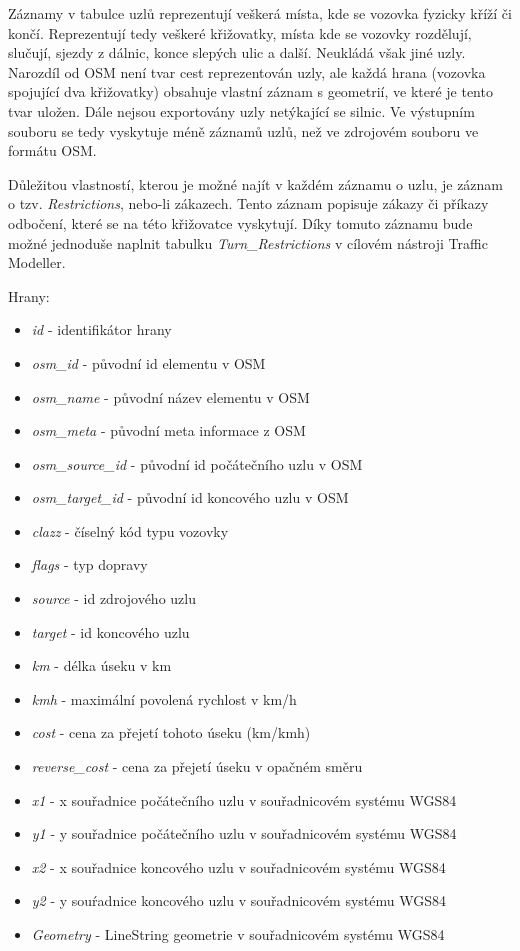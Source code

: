 Záznamy v tabulce uzlů reprezentují veškerá místa, kde se vozovka fyzicky kříží či končí. Reprezentují tedy veškeré křižovatky, místa kde se vozovky rozdělují, slučují, sjezdy z dálnic, konce slepých ulic a další. Neukládá však jiné uzly. Narozdíl od OSM není tvar cest reprezentován uzly, ale každá hrana (vozovka spojující dva křižovatky) obsahuje vlastní záznam s geometrií, ve které je tento tvar uložen. Dále nejsou exportovány uzly netýkající se silnic. Ve výstupním souboru se tedy vyskytuje méně záznamů uzlů, než ve zdrojovém souboru ve formátu OSM. 

Důležitou vlastností, kterou je možné najít v každém záznamu o uzlu, je záznam o tzv. \textit{Restrictions}, nebo-li zákazech. Tento záznam popisuje zákazy či příkazy odbočení, které se na této křižovatce vyskytují. Díky tomuto záznamu bude možné jednoduše naplnit tabulku \textit{Turn\_Restrictions} v cílovém nástroji Traffic Modeller.

Hrany:
\begin{itemize}
  \item \textit{id} - identifikátor hrany
  \item \textit{osm\_id} - původní id elementu v OSM
  \item \textit{osm\_name} - původní název elementu v OSM
  \item \textit{osm\_meta} - původní meta informace z OSM
  \item \textit{osm\_source\_id} - původní id počátečního uzlu v OSM
  \item \textit{osm\_target\_id} - původní id koncového uzlu v OSM
  \item \textit{clazz} - číselný kód typu vozovky
  \item \textit{flags} - typ dopravy
  \item \textit{source} - id zdrojového uzlu
  \item \textit{target} - id koncového uzlu
  \item \textit{km} - délka úseku v km
  \item \textit{kmh} - maximální povolená rychlost v km/h
  \item \textit{cost} - cena za přejetí tohoto úseku (km/kmh)
  \item \textit{reverse\_cost} - cena za přejetí úseku v opačném směru
  \item \textit{x1} - x souřadnice počátečního uzlu v souřadnicovém systému WGS84
  \item \textit{y1} - y souřadnice počátečního uzlu v souřadnicovém systému WGS84
  \item \textit{x2} - x souřadnice koncového uzlu v souřadnicovém systému WGS84
  \item \textit{y2} - y souŕadnice koncového uzlu v souřadnicovém systému WGS84
  \item \textit{Geometry} - LineString geometrie v souřadnicovém systému WGS84
\end{itemize}
\vspace{10pt}

